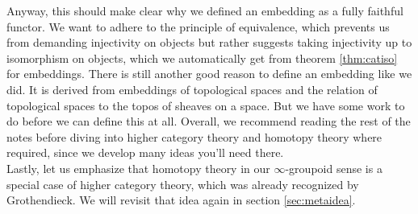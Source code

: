 Anyway, this should make clear why we defined an embedding as a fully faithful functor.
We want to adhere to the principle of equivalence, which prevents us from demanding injectivity on objects but rather suggests taking injectivity up to isomorphism on objects, which we automatically get from theorem \ref{thm:catiso} for embeddings.
There is still another good reason to define an embedding like we did.
It is derived from embeddings of topological spaces and the relation of topological spaces to the {\glqq}topos of sheaves on a space{\grqq}.
But we have some work to do before we can define this at all.
Overall, we recommend reading the rest of the notes before diving into higher category theory and homotopy theory where required, since we develop many ideas you'll need there.
\\
Lastly, let us emphasize that homotopy theory in our $\infty$-groupoid sense is a special case of higher category theory, which was already recognized by Grothendieck.
We will revisit that idea again in section \ref{sec:metaidea}.
